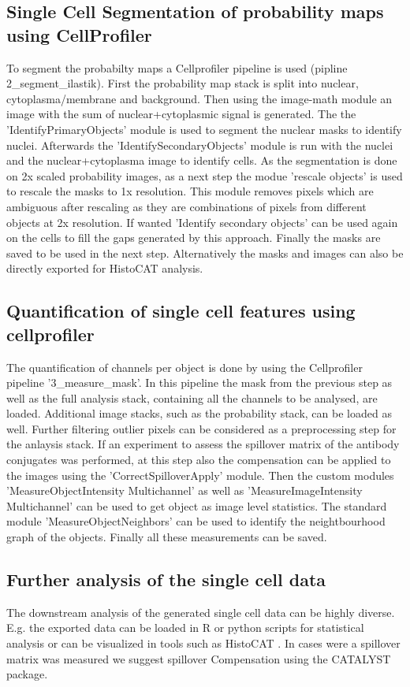 \documentclass[a4paper]{article}
\begin{document}
\subsection{Single Cell Segmentation of probability maps using CellProfiler}
To segment the probabilty maps a Cellprofiler pipeline is used (pipline 2\_segment\_ilastik). First the probability map stack is
split into nuclear, cytoplasma/membrane and background. Then using the image-math module an image
with the sum of nuclear+cytoplasmic signal is generated.
The the 'IdentifyPrimaryObjects' module is used to segment the nuclear masks to identify nuclei.
Afterwards the 'IdentifySecondaryObjects' module is run with the nuclei and the
nuclear+cytoplasma image to identify cells.
As the segmentation is done on 2x scaled probability images, as a next step the modue 'rescale
objects' is used to rescale the masks to 1x resolution. This module removes pixels which are
ambiguous after rescaling as they are combinations of pixels from different objects at 2x
resolution. If wanted 'Identify secondary objects' can be used again on the cells to fill the gaps
generated by this approach.
Finally the masks are saved to be used in the next step.
Alternatively the masks and images can also be directly exported for HistoCAT analysis.

\subsection{Quantification of single cell features using cellprofiler}
The quantification of channels per object is done by using the Cellprofiler pipeline '3\_measure\_mask'. In this
pipeline the mask from the previous step as well as the full analysis stack, containing all the
channels to be analysed, are loaded. Additional image stacks, such as the probability stack, can be
loaded as well. Further filtering outlier pixels can be considered as a preprocessing step for the
anlaysis stack. If an experiment to assess the spillover matrix of the antibody conjugates was performed, at this step also the compensation can be applied to the images using the 'CorrectSpilloverApply' module.
Then the custom modules 'MeasureObjectIntensity Multichannel' as well as 'MeasureImageIntensity Multichannel' can be used to get object as
image level statistics. The standard module 'MeasureObjectNeighbors' can be used to identify the neightbourhood graph
of the objects.
Finally all these measurements can be saved.

\subsection{Further analysis of the single cell data}
The downstream analysis of the generated single cell data can be highly diverse. E.g. the exported
data can be loaded in R or python scripts for statistical analysis or can be visualized in tools
such as HistoCAT \cite{schapiro_histocat:_2017}. 
In cases were a spillover matrix was measured we suggest spillover Compensation using the CATALYST package.
\end{document}

